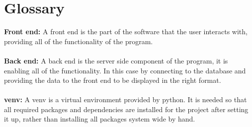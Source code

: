 \documentclass[]{article}
\begin{document}
\section{Glossary}
	\textbf{Front end:} A front end is the part of the software that the user interacts with, providing all of the functionality of the program.\\
	\\
	\textbf{Back end:} A back end is the server side component of the program, it is enabling all of the functionality. In this case by connecting to the database and providing the data to the front end to be displayed in the right format.\\
	\\
	\textbf{venv:} A venv is a virtual environment provided by python. It is needed so that all required packages and dependencies are installed for the project after setting it up, rather than installing all packages system wide by hand.
\end{document}
